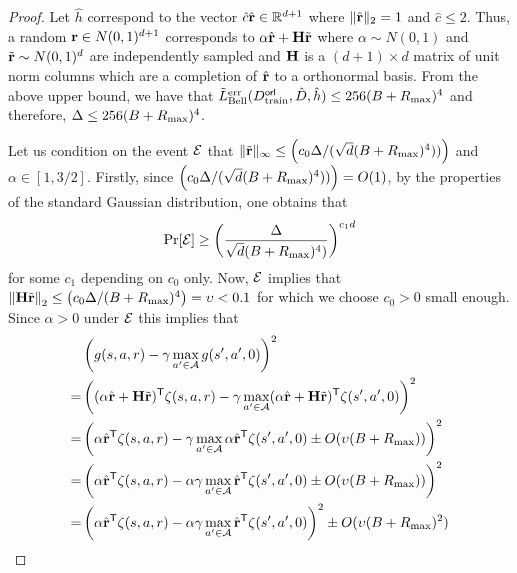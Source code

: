 \begin{proof}
    Let $\hat{h}$ correspond to the vector  $\hat{c}\hat{{\mathbf{r}}} \in \mathbb{R}^{d+1}$ where $\|\hat{{\mathbf{r}}}\|_2 = 1$ and $\hat{c} \leq 2$. Thus, a random ${\mathbf{r}} \in N(0,1)^{d+1}$ corresponds to $\alpha \hat{{\mathbf{r}}} + \mathbf{H}\tilde{{\mathbf{r}}}$ where $\alpha \sim N(0,1)$ and $\tilde{{\mathbf{r}}} \sim N(0,1)^d$ are independently sampled and $\mathbf{H}$ is a $(d+1)\times d$ matrix of unit norm columns which are a completion of $\hat{{\mathbf{r}}}$ to a orthonormal basis. From the above upper bound, we have that $\tilde{L}^{\textnormal{err}}_{\textnormal{Bell}}(D^{\sf orl}_{\textnormal{train}},  \hat{D}, \hat{h}) \leq 256 (B + R_{\textnormal{max}})^4$ and therefore, $\Delta \leq 256 (B + R_{\textnormal{max}})^4$. 
    
    Let us condition on the event $\mathcal{E}$ that $\|\tilde{{\mathbf{r}}}\|_\infty \leq \left(c_0\Delta/(\sqrt{d}(B + R_{\textnormal{max}})^4))\right)$ and $\alpha \in [1, 3/2]$. Firstly, since $\left(c_0\Delta/(\sqrt{d}(B + R_{\textnormal{max}})^4))\right) = O(1)$, by the properties of the standard Gaussian distribution, one obtains that
    \begin{equation}
        \Pr[\mathcal{E}] \geq \left(\frac{\Delta}{\sqrt{d}(B+R_{\textnormal{max}})^4)}\right)^{c_1 d}
    \end{equation}
    for some $c_1$ depending on $c_0$ only. Now, $\mathcal{E}$ implies that $\left\|\mathbf{H}\tilde{{\mathbf{r}}}\right\|_2 \leq \left(c_0\Delta/(B + R_{\textnormal{max}})^4\right) = \upsilon < 0.1$ for which we choose $c_0 > 0$ small enough.
    Since $\alpha > 0$ under $\mathcal{E}$ this implies that
    \begin{align}
        &\left(g(s, a,r) - \gamma \max_{a' \in \mc{A}} g(s',a',0)\right)^2 \nonumber \\
        = & \left((\alpha \hat{\br} + \mb{H}\tilde{\br})^{\sf T}\zeta(s, a,r) - \gamma \max_{a' \in \mc{A}} (\alpha \hat{\br} + \mb{H}\tilde{\br})^{\sf T}\zeta(s', a',0)\right)^2 \nonumber \\
        = &\left(\alpha \hat{\br}^{\sf T}\zeta(s, a,r) - \gamma  \max_{a' \in \mc{A}} \alpha \hat{\br}^{\sf T}\zeta(s', a',0) \pm O(\upsilon (B + R_{\tn{max}}))\right)^2 \nonumber \\
        = &\left(\alpha \hat{\br}^{\sf T}\zeta(s, a,r) - \alpha\gamma  \max_{a' \in \mc{A}} \hat{\br}^{\sf T}\zeta(s', a',0) \pm O(\upsilon (B + R_{\tn{max}}))\right)^2 \nonumber \\
        = &\left(\alpha \hat{\br}^{\sf T}\zeta(s, a,r) - \alpha\gamma  \max_{a' \in \mc{A}} \hat{\br}^{\sf T}\zeta(s', a',0)\right)^2 \pm O(\upsilon (B + R_{\tn{max}})^2) \nonumber \\

\end{align}
\end{proof}
